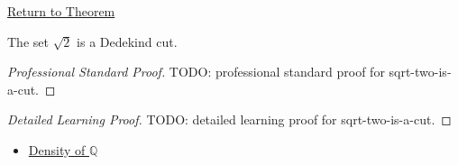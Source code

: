 \newpage
{}
\label{prf:sqrt-two-is-a-cut}

\begin{remark*}[Return]
\hyperref[lem:sqrt-two-is-a-cut]{Return to Theorem}
\end{remark*}

\begin{lemma*}
The set $\sqrt{2}$ is a Dedekind cut.
\end{lemma*}

\begin{proof}[Professional Standard Proof]
\LRAProofBodyStart
TODO: professional standard proof for sqrt-two-is-a-cut.
\end{proof}

\begin{proof}[Detailed Learning Proof]
\LRAProofBodyStart
TODO: detailed learning proof for sqrt-two-is-a-cut.
\end{proof}

\begin{remark*}
\end{remark*}

\begin{dependencies}
\begin{itemize}
  \item \hyperref[thm:density-of-q]{Density of $\mathbb{Q}$}
\end{itemize}
\end{dependencies}

\clearpage
